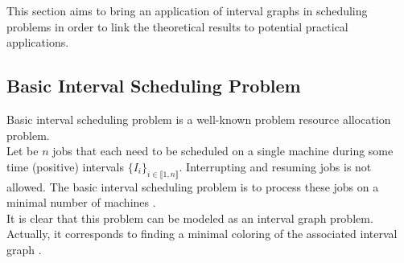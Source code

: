 \documentclass{article}
\begin{document}
This section aims to bring an application of interval graphs in scheduling problems in order to link the theoretical results to potential practical applications.

\subsection{Basic Interval Scheduling Problem}

Basic interval scheduling problem is a well-known problem resource allocation problem. \\

Let be $n$ jobs that each need to be scheduled on a single machine during some time (positive) intervals $\{I_i\}_{i\in\llbracket 1,n \rrbracket}$.
Interrupting and resuming jobs is not allowed. The basic interval scheduling problem is to process these jobs on a minimal number of machines \cite{kolen}.\\

It is clear that this problem can be modeled as an interval graph problem.\\
Actually, it corresponds to finding a minimal coloring of the associated interval graph \cite{golumbic}.



\end{document}

